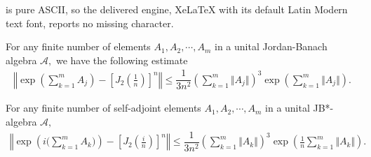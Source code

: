\documentclass[10pt,a4paper]{amsart}
\begin{document}
is pure ASCII, so the delivered engine, XeLaTeX with its default Latin Modern text font, reports no missing character.
\begin{thm} \label{thm:Trotter:first:JordanBanach}
For any finite number of elements $A_1, A_2,\cdots, A_m$ in a unital Jordan-Banach algebra $\mathcal{A},$ we have the following estimate 
\begin{align}\label{ineq:Trotter:first:JordanBanach}
    		\left\Vert \exp \left( \sum_{k=1}^m A_j\right)-\left[J_2\left(\frac{1}{n}\right)\right]^n\right \Vert	
    		\leq
    		\dfrac{1}{3n^2}\left( \sum_{k=1}^m \Vert A_j\Vert\right)^3\exp\left(\sum_{k=1}^m {\Vert A_j\Vert}\right).	
    \end{align} 	
\end{thm}

\begin{thm}\label{thm:Trotter:first:JB*}
    For any finite number of self-adjoint elements $A_1, A_2,\cdots, A_m$ in a unital JB*-algebra $\mathcal{A},$ 
    \begin{align}\label{ineq:Trotter:first:JB*}
    		\left\Vert \exp \left( i\bigg(\sum_{k=1}^m A_k\bigg)\right)-\left[J_2\left(\frac{i}{n}\right)\right]^n\right \Vert	
    		\leq
    		\dfrac{1}{3n^2}\left( \sum_{k=1}^m \Vert A_k\Vert\right)^3\exp\left(\frac{1}{n}\sum_{k=1}^m {\Vert A_k\Vert}\right).	
    \end{align} 
\end{thm}
\end{document}
